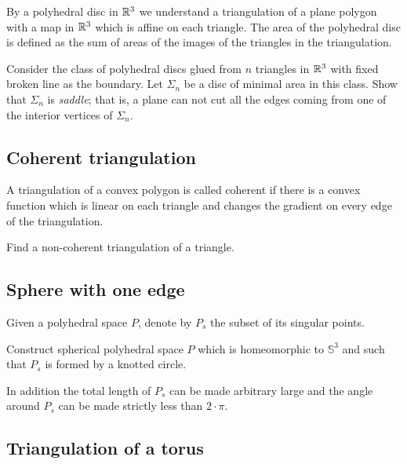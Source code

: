 By a polyhedral disc in $\mathbb{R}^3$
we understand a triangulation of a plane polygon with a map in $\mathbb{R}^3$ which is affine on each triangle.
The area of the polyhedral disc is defined as the sum of areas of the images of the triangles in the triangulation.

\begin{pr}
Consider the  class of polyhedral discs glued from $n$ triangles in $\mathbb{R}^3$ 
with fixed broken line as the boundary.
Let $\Sigma_n$ be a disc of minimal area in this class.
Show that $\Sigma_n$ is  \emph{saddle};
that is, a plane can not cut all the edges coming from one of the interior vertices of $\Sigma_n$.
\end{pr}

\subsection*{Coherent triangulation\easy}\label{Coherent triangulation} 

A triangulation of a convex polygon is called coherent if there is a convex function which is linear on each triangle and changes the gradient on every edge of the triangulation.

\begin{pr}
Find a non-coherent triangulation of a triangle.
\end{pr}

\subsection*{Sphere with one edge\hard}\label{panov-S^3} 

Given  a polyhedral space $P$,
denote by $P_s$ the subset of its 
singular points.

\begin{pr}
Construct spherical polyhedral space $P$ which is homeomorphic to $\mathbb{S}^3$ and such that $P_s$ is formed by a knotted circle.
\end{pr}

In addition the total length of $P_s$ can be made arbitrary large and the angle around $P_s$ can be made strictly less than $2\cdot\pi$.

\subsection*{Triangulation of a torus}\label{Triangulation of a torus}

